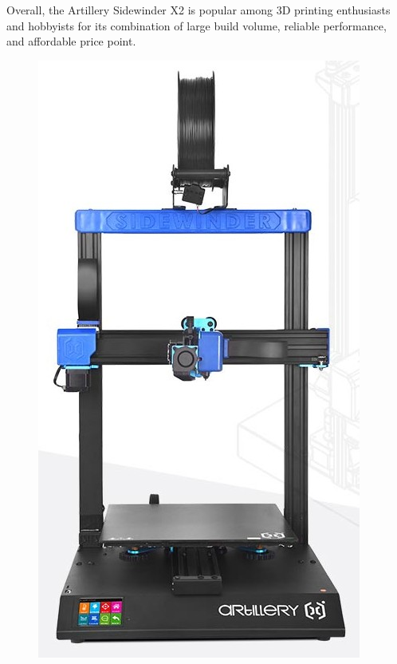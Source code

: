 Overall, the Artillery Sidewinder X2 is popular among 3D printing enthusiasts and hobbyists for its combination of large build volume,
reliable performance, and affordable price point.

\begin{figure}[h!tb]
\centering
\begin{multicols}{3}
\includegraphics[scale=0.20]{x2-f1-edited.jpg}\par

\end{multicols}
\end{figure}
